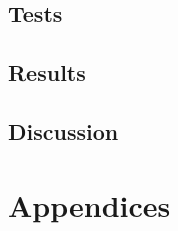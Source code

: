 \documentclass{report}
\begin{document}
\chapter{Tests}
	

\chapter{Results}
	

\chapter{Discussion}
	

\printindex
\printglossaries

\part{Appendices}
	



\nocite{*}
\end{document}
